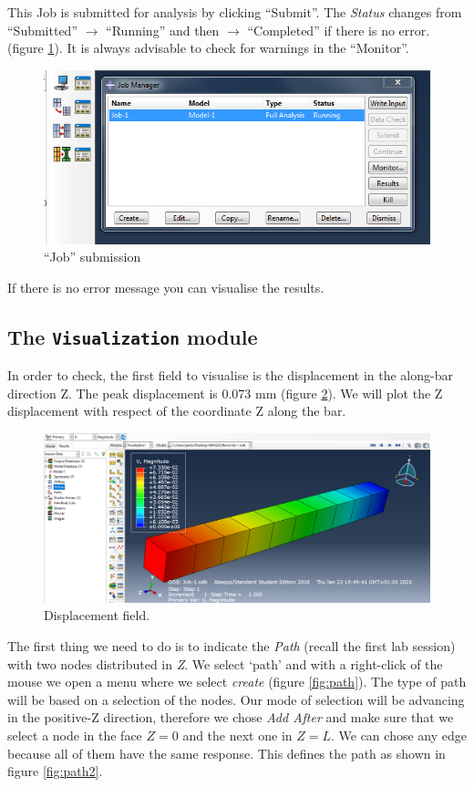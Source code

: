 \documentclass[spanish,a4paper,12pt]{article}
\begin{document}
This Job is submitted for analysis by clicking ``Submit''. The \emph{Status} changes from ``Submitted'' $\to$ ``Running'' and then $\to$ ``Completed'' if there is no error. 
(figure \ref{fig:job-submit}). It is always advisable to check for warnings in the ``Monitor''.
\begin{figure}[h!tp]
\centering
\includegraphics[scale=0.5]{capturas/38-job.png}
\caption{``Job'' submission}
\label{fig:job-submit}
\end{figure}

If there is no error message you can visualise the results.

\clearpage
\subsection{The \texttt{Visualization} module}

In order to check, the first field to visualise is the displacement in the along-bar direction Z. The peak displacement is 0.073 mm (figure \ref{fig:U}). We will plot the Z displacement with respect of the coordinate Z along the bar. 

\begin{figure}[h!tp]
\centering
\includegraphics[scale=0.35]{capturas/res1.png}
\caption{Displacement field.}
\label{fig:U}%
\end{figure}

The first thing we need to do is to indicate the \emph{Path} (recall the first lab session) with two nodes distributed in \emph{Z}. We select `path' and with a right-click of the mouse we open a menu where we select \emph{create} (figure \ref{fig:path}). The type of path will be based on a selection of the nodes. Our mode of selection will be advancing in the positive-Z direction, therefore we chose \emph{Add After} and make sure that we select a node in the face $Z=0$ and the next one in $Z=L$. We can chose any edge because all of them have the same response. This defines the path as shown in figure \ref{fig:path2}.
\end{document}
